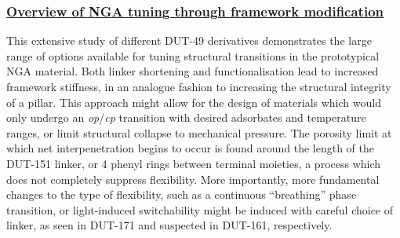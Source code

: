 \subsubsection{\underline{Overview of NGA tuning through framework modification}}

This extensive study of different DUT-49 derivatives demonstrates the 
large range of options available for tuning structural 
transitions in the prototypical NGA material. Both linker 
shortening and functionalisation lead to increased framework
stiffness, in an analogue fashion to increasing the 
structural integrity of a pillar. This approach might allow 
for the design of materials which would only undergo an 
\textit{op}/\textit{cp} transition with desired adsorbates and
temperature ranges, or limit structural collapse to mechanical 
pressure. The porosity limit at which net interpenetration begins
to occur is found around the length of the DUT-151 linker, 
or 4 phenyl rings between terminal moieties, a process which does 
not completely suppress flexibility. More importantly, more 
fundamental changes to the type of flexibility, such as 
a continuous ``breathing'' phase transition, or light-induced
switchability might be induced with careful choice of linker,
as seen in DUT-171 and suspected in DUT-161, respectively.